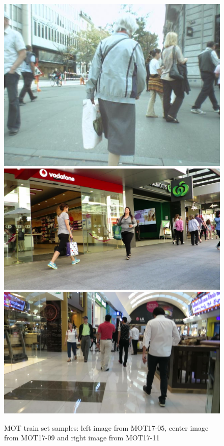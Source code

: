 \begin{figure}[H]
\begin{center}
\includegraphics[scale=0.2]{figures/000334.jpg}
\includegraphics[scale=0.08]{figures/000388.jpg}
\includegraphics[scale=0.08]{figures/000487.jpg}
\caption{MOT train set samples: left image from MOT17-05, center image from MOT17-09 and right image from MOT17-11}
\label{fig:mot_images}
\end{center}
\end{figure}
